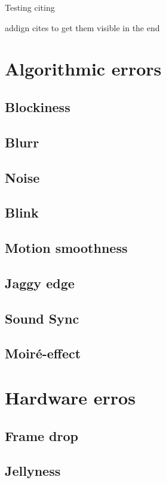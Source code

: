 

Testing citing ~\cite{4799375}

addign cites to get them visible in the end
~\cite{5464831}
~\cite{5583037}
~\cite{5583094}
~\cite{5710601}
~\cite{5739529}
~\cite{6081486}
~\cite{6116319}
~\cite{6411890}
~\cite{6467556}
~\cite{6625056}
~\cite{6705673}
~\cite{5605523}
~\cite{5290984}
~\cite{1203346}
~\cite{4803123}
~\cite{4799318}
~\cite{5381595}
~\cite{6229729}
~\cite{4347144}
~\cite{1247211}



\section{Algorithmic errors}
\subsection{Blockiness}
\subsection{Blurr}
\subsection{Noise}
\subsection{Blink}
\subsection{Motion smoothness}
\subsection{Jaggy edge}
\subsection{Sound Sync}
\subsection{Moir\'{e}-effect}
\section{Hardware  erros}
\subsection{Frame drop}
\subsection{Jellyness}
